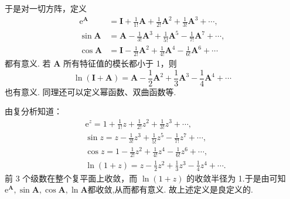 \documentclass[../../main.tex]{subfiles}
\begin{document}
\begin{definition}\label{definition:矩阵函数}
于是对一切方阵，定义
\begin{align*}
\mathrm{e}^{\boldsymbol{A}}&= \boldsymbol{I}+\frac{1}{1!}\boldsymbol{A}+\frac{1}{2!}\boldsymbol{A}^{2}+\frac{1}{3!}\boldsymbol{A}^{3}+\cdots,\\
\sin\boldsymbol{A}&= \boldsymbol{A}-\frac{1}{3!}\boldsymbol{A}^{3}+\frac{1}{5!}\boldsymbol{A}^{5}-\frac{1}{7!}\boldsymbol{A}^{7}+\cdots,\\
\cos\boldsymbol{A}&= \boldsymbol{I}-\frac{1}{2!}\boldsymbol{A}^{2}+\frac{1}{4!}\boldsymbol{A}^{4}-\frac{1}{6!}\boldsymbol{A}^{6}+\cdots
\end{align*}
都有意义. 若 $\boldsymbol{A}$ 所有特征值的模长都小于 1，则 
\[
\ln(\boldsymbol{I}+\boldsymbol{A})=\boldsymbol{A}-\frac{1}{2}\boldsymbol{A}^{2}+\frac{1}{3}\boldsymbol{A}^{3}-\frac{1}{4}\boldsymbol{A}^{4}+\cdots
\]
也有意义. 同理还可以定义幂函数、双曲函数等. 
\end{definition}
\begin{remark}
由复分析知道：
\begin{align*}
&\mathrm{e}^{z}= 1+\frac{1}{1!}z+\frac{1}{2!}z^{2}+\frac{1}{3!}z^{3}+\cdots,\\
&\sin z= z-\frac{1}{3!}z^{3}+\frac{1}{5!}z^{5}-\frac{1}{7!}z^{7}+\cdots,\\
&\cos z= 1-\frac{1}{2!}z^{2}+\frac{1}{4!}z^{4}-\frac{1}{6!}z^{6}+\cdots,\\
&\ln(1 + z)=z-\frac{1}{2}z^{2}+\frac{1}{3}z^{3}-\frac{1}{4}z^{4}+\cdots.
\end{align*}
前 3 个级数在整个复平面上收敛，而 $\ln(1 + z)$ 的收敛半径为 1.于是由可知$\mathrm{e}^{\boldsymbol{A}},\sin \boldsymbol{A},\cos \boldsymbol{A},\ln{\boldsymbol{A}}$都收敛,从而都有意义.
故上述定义是良定义的.
\end{remark}
\end{document}
